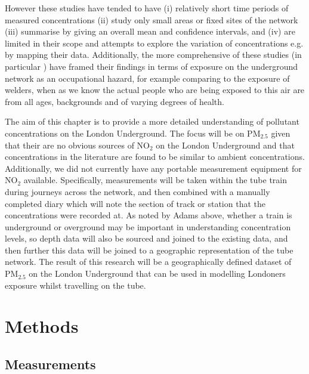 However these studies have tended to have (i) relatively short time periods of measured concentrations (ii) study only small areas or fixed sites of the network (iii) summarise by giving an overall mean and confidence intervals, and (iv) are limited in their scope and attempts to explore the variation of concentrations e.g. by mapping their data. Additionally, the more comprehensive of these studies (in particular \cite{Hurley2003}) have framed their findings in terms of exposure on the underground network as an occupational hazard, for example comparing to the exposure of welders, when as we know the actual people who are being exposed to this air are from all ages, backgrounds and of varying degrees of health.

The aim of this chapter is to provide a more detailed understanding of pollutant concentrations on the London Underground. The focus will be on PM$_{2.5}$ given that their are no obvious sources of NO$_{2}$ on the London Underground and that concentrations in the literature are found to be similar to ambient concentrations. Additionally, we did not currently have any portable measurement equipment for NO$_{2}$ available. Specifically, measurements will be taken within the tube train during journeys across the network, and then combined with a manually completed diary which will note the section of track or station that the concentrations were recorded at. As noted by Adams above, whether a train is underground or overground may be important in understanding concentration levels, so depth data will also be sourced and joined to the existing data, and then further this data will be joined to a geographic representation of the tube network. The result of this research will be a geographically defined dataset of PM$_{2.5}$ on the London Underground that can be used in modelling Londoners exposure whilst travelling on the tube.

\section{Methods}
\label{sec:3methods}

\subsection{Measurements}
\label{measurements}

